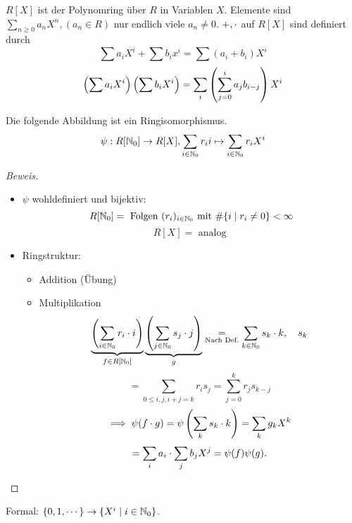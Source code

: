 \documentclass[a4paper]{report}
\begin{document}
\begin{whg*}
  $R[X]$ ist der Polynomring über $R$ in Variablen $X$. Elemente sind $\sum_{n \ge 0} a_{n}X^{n}, (a_{n} \in R)$ nur endlich viele $a_{n} \ne 0$. $+, \cdot$ auf $R[X]$ sind definiert durch
  \[\sum a_{i}X^{i} + \sum b_{i}x^{i} = \sum(a_{i}+b_{i})X^{i}\]
  \[\left(\sum a_{i}X^{i}\right)\left(\sum b_{i}X^{i}\right) = \sum_{i}\left(\sum_{j=0}^{i}a_{j}b_{i-j}\right)X^{i}\]
\end{whg*}

\begin{prop}
  Die folgende Abbildung ist ein Ringisomorphismus.
  \[\psi : R[\mathbb{N}_0] \to R[X], \sum_{i \in \mathbb{N}_0} r_{i}i \mapsto \sum_{i \in \mathbb{N}_0}r_{i}X^{i}\]
  \begin{proof}[Beweis]\item
    \begin{itemize}
      \item $\psi$ wohldefiniert und bijektiv:
            \[R[\mathbb{N}_0] = \text{ Folgen } (r_{i})_{i \in \mathbb{N}_0} \text{ mit } \#\{i \mid r_{i} \ne 0\} < \infty\]
            \[R[X] = \text{ analog }\]
      \item Ringstruktur:
            \begin{itemize}
              \item Addition (Übung)
              \item Multiplikation
                    \[\underbrace{\left(\sum_{i \in \mathbb{N}_0} r_{i}\cdot i\right)}_{f \in R[\mathbb{N}_0]}\underbrace{\left(\sum_{j \in \mathbb{N}_0} s_{j}\cdot j\right)}_{g} \underset{\text{Nach Def.}}= \sum_{k \in \mathbb{N}_0} s_{k}\cdot k, \quad s_{k}\]
                    \[= \sum_{0 \le i,j, i+j = k}r_{i}s_{j} = \sum_{j=0}^{k}r_{j}s_{k-j}\]
                    \[\implies \psi(f \cdot g) = \psi\left(\sum_{k} s_{k}\cdot k\right) = \sum_{k}g_kX^{k}\]
                    \[ = \sum_{i}a_{i}\cdot  \sum_{j}b_{j}X^{j} = \psi(f)\psi(g).\qedhere\]
            \end{itemize}
    \end{itemize}
  \end{proof}
  Formal: $\{0, 1, \cdots\} \to \{X^{i} \mid i \in \mathbb{N}_0\}$.
\end{prop}
\end{document}
